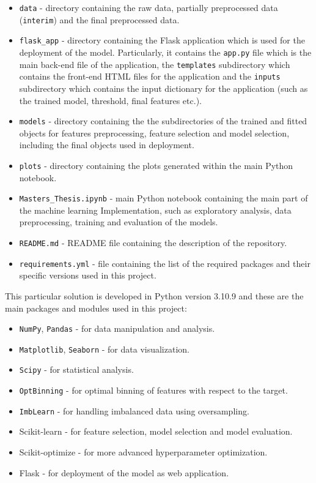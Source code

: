 \begin{itemize}\setlength\itemsep{0em}
    \item \texttt{data} - directory containing the raw data, partially preprocessed data (\texttt{interim}) and the final preprocessed data.
    \item \texttt{flask\_app} - directory containing the Flask application which is used for the deployment of the model. Particularly, it contains the \texttt{app.py} file which is the main back-end file of the application, the \texttt{templates} subdirectory which contains the front-end HTML files for the application and the \texttt{inputs} subdirectory which contains the input dictionary for the application (such as the trained model, threshold, final features etc.).
    \item \texttt{models} - directory containing the the subdirectories of the trained and fitted objects for features preprocessing, feature selection and model selection, including the final objects used in deployment.
    \item \texttt{plots} - directory containing the plots generated within the main Python notebook.
    \item \texttt{Masters\_Thesis.ipynb} - main Python notebook containing the main part of the machine learning Implementation, such as exploratory analysis, data preprocessing, training and evaluation of the models.
    \item \texttt{README.md} - README file containing the description of the repository.
    \item \texttt{requirements.yml} - file containing the list of the required packages and their specific versions used in this project.
\end{itemize}

This particular solution is developed in Python version 3.10.9 and these are the main packages and modules used in this project:
\begin{itemize}\setlength\itemsep{0em}
    \item \lstinline{NumPy}, \lstinline{Pandas} - for data manipulation and analysis.
    \item \lstinline{Matplotlib}, \lstinline{Seaborn} - for data visualization.
    \item \lstinline{Scipy} - for statistical analysis.
    \item \lstinline{OptBinning} - for optimal binning of features with respect to the target.
    \item \lstinline{ImbLearn} - for handling imbalanced data using oversampling.
    \item {Scikit-learn} - for feature selection, model selection and model evaluation.
    \item {Scikit-optimize} - for more advanced hyperparameter optimization.
    \item {Flask} - for deployment of the model as web application.
\end{itemize}

